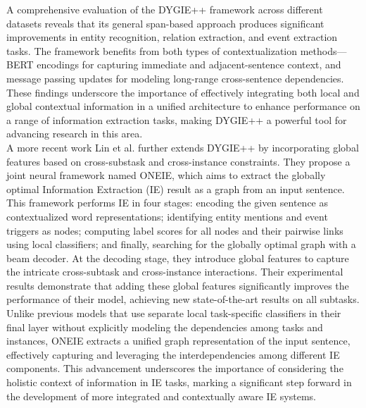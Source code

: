 A comprehensive evaluation of the DYGIE++ framework across different datasets reveals that its general span-based approach produces significant improvements in entity recognition, relation extraction, and event extraction tasks. The framework benefits from both types of contextualization methods—BERT encodings for capturing immediate and adjacent-sentence context, and message passing updates for modeling long-range cross-sentence dependencies. These findings underscore the importance of effectively integrating both local and global contextual information in a unified architecture to enhance performance on a range of information extraction tasks, making DYGIE++ a powerful tool for advancing research in this area.\\
A more recent work Lin et al.\cite{lin-etal-2020-joint} further extends DYGIE++ by incorporating global features based on cross-substask and cross-instance constraints.  They propose a joint neural framework named ONEIE, which aims to extract the globally optimal Information Extraction (IE) result as a graph from an input sentence. This framework performs IE in four stages: encoding the given sentence as contextualized word representations; identifying entity mentions and event triggers as nodes; computing label scores for all nodes and their pairwise links using local classifiers; and finally, searching for the globally optimal graph with a beam decoder. At the decoding stage, they introduce global features to capture the intricate cross-subtask and cross-instance interactions. Their experimental results demonstrate that adding these global features significantly improves the performance of their model, achieving new state-of-the-art results on all subtasks. Unlike previous models that use separate local task-specific classifiers in their final layer without explicitly modeling the dependencies among tasks and instances, ONEIE extracts a unified graph representation of the input sentence, effectively capturing and leveraging the interdependencies among different IE components. This advancement underscores the importance of considering the holistic context of information in IE tasks, marking a significant step forward in the development of more integrated and contextually aware IE systems.\\
